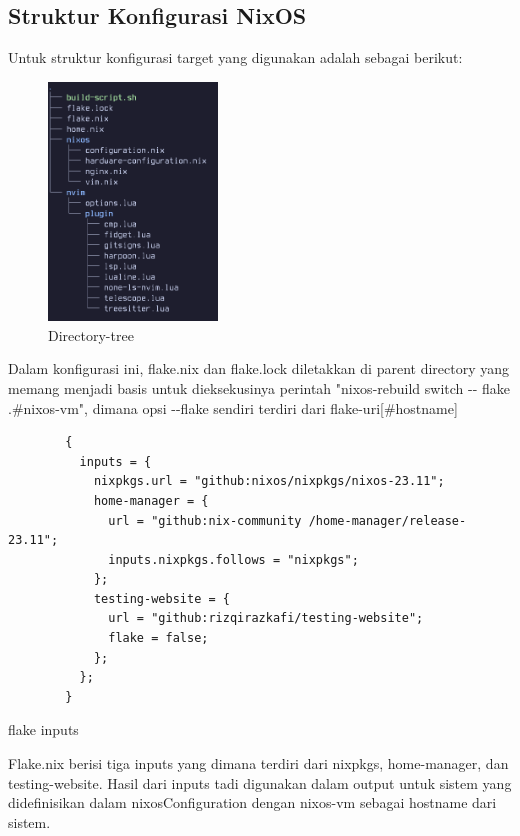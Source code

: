 \documentclass[10pt,]{report}
\newenvironment{code}{\captionsetup{type=listing}}{\vspace{3mm}}
\begin{document}
\begin{adjustwidth}{20pt}{}
	\subsection{Struktur Konfigurasi NixOS}
	\begin{adjustwidth}{20pt}{}
		\vspace{-3mm}
		Untuk struktur konfigurasi target yang digunakan adalah sebagai berikut:
		\begin{figure}[H]
			\centering
			\includegraphics[width=0.4\textwidth]{images/directory-tree.png}
			\caption{Directory-tree}
		\end{figure}

		Dalam konfigurasi ini, flake.nix dan flake.lock diletakkan di parent
		directory yang memang menjadi basis untuk dieksekusinya perintah
		"nixos-rebuild switch -{}- flake .\#nixos-vm", dimana opsi -{}-flake sendiri
		terdiri dari flake-uri[\#hostname]

		\begin{code}
			\begin{verbatim}
        {
          inputs = {
            nixpkgs.url = "github:nixos/nixpkgs/nixos-23.11";
            home-manager = {
              url = "github:nix-community /home-manager/release-23.11";
              inputs.nixpkgs.follows = "nixpkgs";
            };
            testing-website = {
              url = "github:rizqirazkafi/testing-website";
              flake = false;
            };
          };
        }
      \end{verbatim}
			\caption{flake inputs}
		\end{code}

		Flake.nix berisi tiga inputs yang dimana terdiri dari nixpkgs, home-manager,
		dan testing-website. Hasil dari inputs tadi digunakan dalam output untuk
		sistem yang didefinisikan dalam nixosConfiguration dengan nixos-vm sebagai
		hostname dari sistem.


\end{adjustwidth}
\end{adjustwidth}
\end{document}
